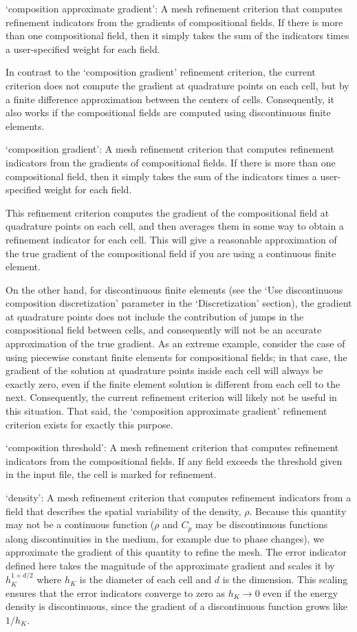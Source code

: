 \begin{itemize}
`composition approximate gradient': A mesh refinement criterion that computes refinement indicators from the gradients of compositional fields. If there is more than one compositional field, then it simply takes the sum of the indicators times a user-specified weight for each field.

In contrast to the `composition gradient' refinement criterion, the current criterion does not compute the gradient at quadrature points on each cell, but by a finite difference approximation between the centers of cells. Consequently, it also works if the compositional fields are computed using discontinuous finite elements.

`composition gradient': A mesh refinement criterion that computes refinement indicators from the gradients of compositional fields. If there is more than one compositional field, then it simply takes the sum of the indicators times a user-specified weight for each field.

This refinement criterion computes the gradient of the compositional field at quadrature points on each cell, and then averages them in some way to obtain a refinement indicator for each cell. This will give a reasonable approximation of the true gradient of the compositional field if you are using a continuous finite element.

On the other hand, for discontinuous finite elements (see the `Use discontinuous composition discretization' parameter in the `Discretization' section), the gradient at quadrature points does not include the contribution of jumps in the compositional field between cells, and consequently will not be an accurate approximation of the true gradient. As an extreme example, consider the case of using piecewise constant finite elements for compositional fields; in that case, the gradient of the solution at quadrature points inside each cell will always be exactly zero, even if the finite element solution is different from each cell to the next. Consequently, the current refinement criterion will likely not be useful in this situation. That said, the `composition approximate gradient' refinement criterion exists for exactly this purpose.

`composition threshold': A mesh refinement criterion that computes refinement indicators from the compositional fields. If any field exceeds the threshold given in the input file, the cell is marked for refinement.

`density': A mesh refinement criterion that computes refinement indicators from a field that describes the spatial variability of the density, $\rho$. Because this quantity may not be a continuous function ($\rho$ and $C_p$ may be discontinuous functions along discontinuities in the medium, for example due to phase changes), we approximate the gradient of this quantity to refine the mesh. The error indicator defined here takes the magnitude of the approximate gradient and scales it by $h_K^{1+d/2}$ where $h_K$ is the diameter of each cell and $d$ is the dimension. This scaling ensures that the error indicators converge to zero as $h_K\rightarrow 0$ even if the energy density is discontinuous, since the gradient of a discontinuous function grows like $1/h_K$.


\end{itemize}
